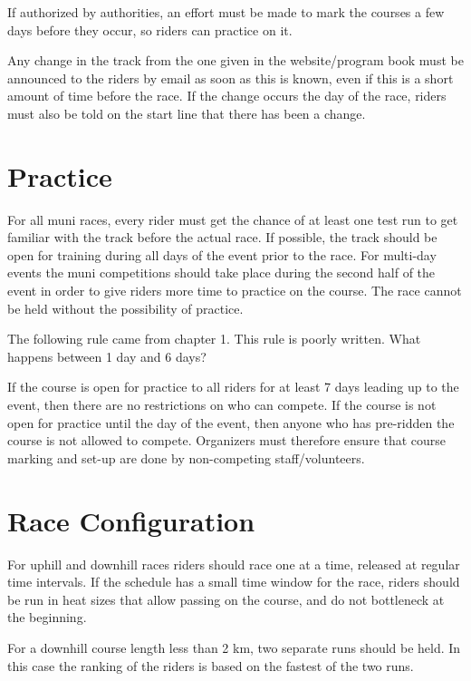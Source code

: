 If authorized by authorities, an effort must be made to mark the courses a few days before they occur, so riders can practice on it.

Any change in the track from the one given in the website/program book must be announced to the riders by email as soon as this is known, even if this is a short amount of time before the race.
If the change occurs the day of the race, riders must also be told on the start line that there has been a change.

\section{Practice}

For all muni races, every rider must get the chance of at least one test run to get familiar with the track before the actual race.
If possible, the track should be open for training during all days of the event prior to the race.
For multi-day events the muni competitions should take place during the second half of the event in order to give riders more time to practice on the course.
The race cannot be held without the possibility of practice.

\begin{comment2016}
The following rule came from chapter 1.
This rule is poorly written.
What happens between 1 day and 6 days?
\end{comment2016}

If the course is open for practice to all riders for at least 7 days leading up to the event, then there are no restrictions on who can compete.
If the course is not open for practice until the day of the event, then anyone who has pre-ridden the course is not allowed to compete.
Organizers must therefore ensure that course marking and set-up are done by non-competing staff/volunteers.

\section{Race Configuration}

For uphill and downhill races riders should race one at a time, released at regular time intervals.
If the schedule has a small time window for the race, riders should be run in heat sizes that allow passing on the course, and do not bottleneck at the beginning.

For a downhill course length less than 2 km, two separate runs should be held.
In this case the ranking of the riders is based on the fastest of the two runs.

